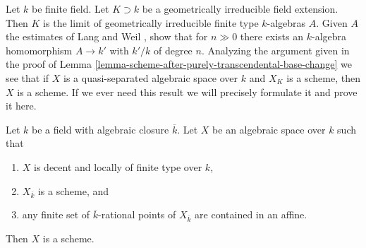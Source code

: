 \begin{remark}
\label{remark-when-does-the-argument-work}
Let $k$ be finite field. Let $K \supset k$ be a geometrically
irreducible field extension. Then $K$ is the limit of geometrically
irreducible finite type $k$-algebras $A$. Given $A$ the estimates
of Lang and Weil \cite{LW}, show that for $n \gg 0$ there exists
an $k$-algebra homomorphism $A \to k'$ with $k'/k$ of degree $n$.
Analyzing the argument given in the proof of
Lemma \ref{lemma-scheme-after-purely-transcendental-base-change}
we see that if $X$ is a quasi-separated algebraic space over $k$
and $X_K$ is a scheme, then $X$ is a scheme. If we ever need this
result we will precisely formulate it and prove it here.
\end{remark}

\begin{lemma}
\label{lemma-scheme-over-algebraic-closure-enough-affines}
Let $k$ be a field with algebraic closure $\overline{k}$. Let $X$
be an algebraic space over $k$ such that
\begin{enumerate}
\item $X$ is decent and locally of finite type over $k$,
\item $X_{\overline{k}}$ is a scheme, and
\item any finite set of $\overline{k}$-rational points of $X_{\overline{k}}$
are contained in an affine.
\end{enumerate}
Then $X$ is a scheme.
\end{lemma}

